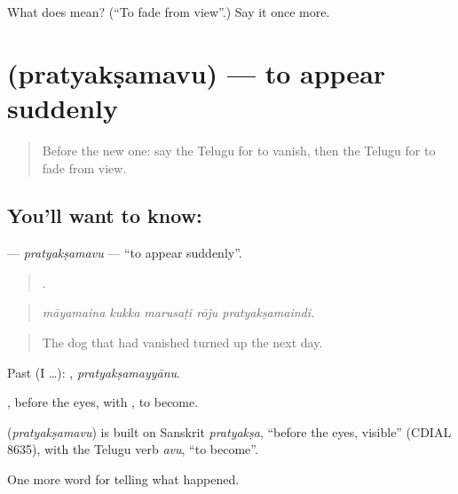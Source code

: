 \begin{tcolorbox}[breakable,colback=teal!4,colframe=teal!35!black,title={Before you move on}]
What does  mean? (\textquotedblleft{}To fade from view\textquotedblright{}.) Say it once more.
\end{tcolorbox}
\section[\texorpdfstring{\te{ప్రత్యక్షమవు} (pratyakṣamavu)}{ప్రత్యక్షమవు (pratyakṣamavu)}]{ (pratyakṣamavu) — to appear suddenly}

\label{lesson:TE-C353-pratyaksamavu}



\begin{quote}
Before the new one: say the Telugu for to vanish, then the Telugu for to fade from view.
\end{quote}

\subsection*{You'll want to know: }
\textbf{} — \emph{pratyakṣamavu} — \textquotedblleft{}to appear suddenly\textquotedblright{}.

\begin{quote}
    .
\end{quote}

\begin{quote}
\emph{māyamaina kukka marusaṭi rōju pratyakṣamaindi.}
\end{quote}

\begin{quote}
The dog that had vanished turned up the next day.
\end{quote}

Past (I …): , \emph{pratyakṣamayyānu}.

, before the eyes, with , to become.

\begin{cousinweb}
\textbf{} (\emph{pratyakṣamavu}) is built on Sanskrit \emph{pratyakṣa}, \textquotedblleft{}before the eyes, visible\textquotedblright{} (CDIAL 8635), with the Telugu verb \emph{avu}, \textquotedblleft{}to become\textquotedblright{}.
\end{cousinweb}

\begin{grammarlens}[title={What you've built}]
One more word for telling what happened.
\end{grammarlens}

